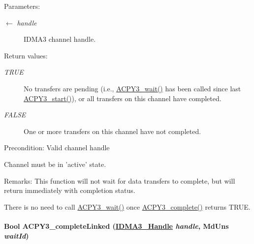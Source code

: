 \begin{Desc}
\item[Parameters:]
\begin{description}
\item[\mbox{$\leftarrow$} {\em handle}]IDMA3 channel handle.\end{description}
\end{Desc}
\begin{Desc}
\item[Return values:]
\begin{description}
\item[{\em TRUE}]No transfers are pending (i.e., \hyperlink{group___d_s_p_a_c_p_y3_g499bc0643a52f5cfd0828c1ce21cd69b}{ACPY3\_\-wait()} has been called since last \hyperlink{group___d_s_p_a_c_p_y3_gb4102200f00a9df3961a8374c0042bed}{ACPY3\_\-start()}), or all transfers on this channel have completed. \item[{\em FALSE}]One or more transfers on this channel have not completed.\end{description}
\end{Desc}
\begin{Desc}
\item[Precondition:]Valid channel handle 

Channel must be in 'active' state.\end{Desc}
\begin{Desc}
\item[Remarks:]This function will not wait for data transfers to complete, but will return immediately with completion status. 

There is no need to call \hyperlink{group___d_s_p_a_c_p_y3_g499bc0643a52f5cfd0828c1ce21cd69b}{ACPY3\_\-wait()} once \hyperlink{group___d_s_p_a_c_p_y3_ge22deca1f6878a359a619cff8654d9de}{ACPY3\_\-complete()} returns TRUE. \end{Desc}
\hypertarget{group___d_s_p_a_c_p_y3_g88a22e18670a97816b27dcd90abf2ae9}{
\paragraph[ACPY3\_\-completeLinked]{\setlength{\rightskip}{0pt plus 5cm}Bool ACPY3\_\-complete\-Linked (\hyperlink{struct_i_d_m_a3___obj}{IDMA3\_\-Handle} {\em handle}, Md\-Uns {\em wait\-Id})}\hfill}
\label{group___d_s_p_a_c_p_y3_g88a22e18670a97816b27dcd90abf2ae9}



